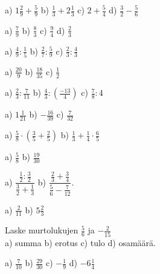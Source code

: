 \begin{tehtava}
a) $1\frac{2}{9}+\frac{5}{9}$ \qquad b) $\frac{1}{3}+2\frac{1}{3}$ \qquad c) $2+\frac{5}{4}$ \qquad
d) $ \frac{3}{2}-\frac{5}{6}$
\begin{vastaus}
a) $\frac{7}{9}$ \qquad b) $\frac{8}{3}$ \qquad c) $\frac{9}{4}$ \qquad d) $\frac{2}{3}$
\end{vastaus}
\end{tehtava}


\begin{tehtava}
a) $\frac{4}{9} : \frac{1}{5}$ \qquad b) $\frac{2}{7}:\frac{5}{9}$ \qquad c) $\frac{2}{3}:\frac{4}{3}$
\begin{vastaus}
a) $\frac{20}{9}$ \qquad b) $\frac{18}{35}$ \qquad c) $\frac{1}{2}$
\end{vastaus}
\end{tehtava}

\begin{tehtava}
a) $\frac{2}{3} : \frac{7}{11}$ \qquad b) $\frac{4}{3}:(\frac{-13}{4})$ \qquad c) $\frac{7}{8}:4$
\begin{vastaus}
a) $1\frac{1}{21}$ \qquad b) $-\frac{16}{39}$ \qquad c) $\frac{7}{32}$
\end{vastaus}
\end{tehtava}

\begin{tehtava}
a) $\frac{5}{8}\cdot(\frac{3}{5}+\frac{2}{5})$ \qquad b) $\frac{1}{3}+\frac{1}{4}\cdot\frac{6}{5}$
\begin{vastaus}
a) $\frac{5}{8}$ \qquad b) $\frac{19}{30}$
\end{vastaus}
\end{tehtava}

\begin{tehtava}
a) $\dfrac{\frac{1}{2}:\frac{3}{2}}{\frac{3}{2}+\frac{1}{3}}$ \qquad b) $\dfrac{\frac{2}{3}+\frac{3}{4}}{\frac{5}{6}-\frac{7}{12}}$.
\begin{vastaus}
a) $\frac{2}{11}$ \qquad b) $5\frac{2}{3}$
\end{vastaus}
\end{tehtava}

\begin{tehtava}
Laske murtolukujen $\frac{5}{6}$ ja $-\frac{2}{15}$ \\ a) summa \qquad b) erotus \qquad c) tulo \qquad d) osamäärä.
\begin{vastaus}
a) $\frac{7}{10}$ \qquad b) $\frac{29}{30}$ \qquad c) $-\frac{1}{9}$ \qquad d) $-6\frac{1}{4}$
\end{vastaus}
\end{tehtava}

